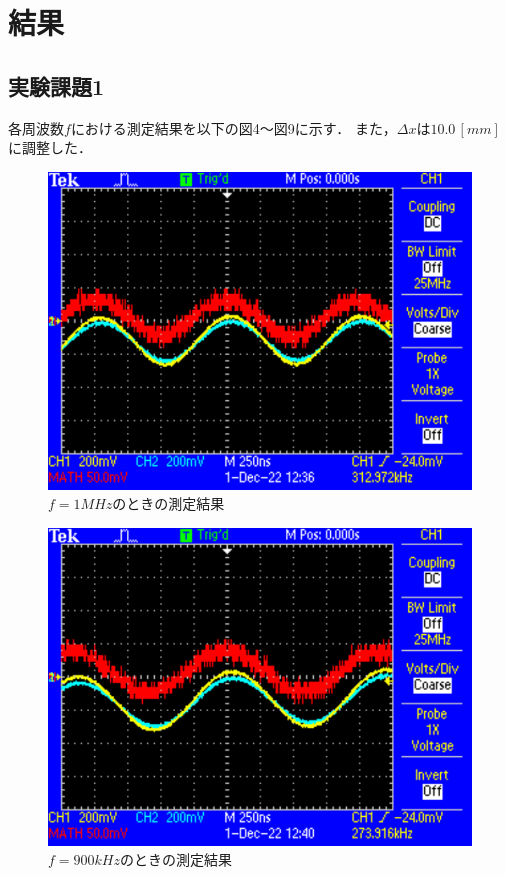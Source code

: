 
\section{結果}

\subsection{実験課題1}
各周波数$f$における測定結果を以下の図4～図9に示す．
また，$\Delta x$は$10.0\,[\si{mm}]$に調整した．

\begin{figure}[H]
    \centering
    \includegraphics[scale=0.5]{F0001.pdf}
    \caption{$f=1\si{MHz}$のときの測定結果}
\end{figure}

\begin{figure}[H]
    \centering
    \includegraphics[scale=0.5]{F0002.pdf}
    \caption{$f=900\si{kHz}$のときの測定結果}
\end{figure}

